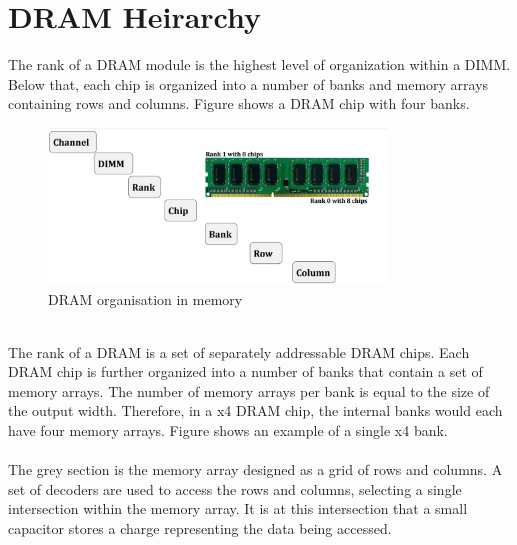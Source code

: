 \documentclass[11pt, conference, onecolumn]{IEEEtran}
\begin{document}
\section{DRAM Heirarchy}
The rank of a DRAM module is the highest level of organization within a DIMM. Below that, each chip is organized into a number of banks and memory arrays containing rows and columns. Figure shows a DRAM chip with four banks. \\
\begin{figure}
		\begin{center}
		\includegraphics[width=0.8\textwidth]{dramorg.png}
		\caption {DRAM organisation in memory}
		\end{center}	
	\end{figure}\\The rank of a DRAM is a set of separately addressable DRAM chips. Each DRAM chip is further organized into a number of banks that contain a set of memory arrays. The number of memory arrays per bank is equal to the size of the output width. Therefore, in a x4 
DRAM chip, the internal banks would each have four memory arrays. Figure shows an example of a single x4 bank.\\
\\The grey section is the memory array designed as a grid of rows and columns. A set of decoders are used to access the rows and columns, selecting a single intersection within the memory array. It is at this intersection that a small capacitor stores a charge representing the data being accessed.\\
\end{document}
